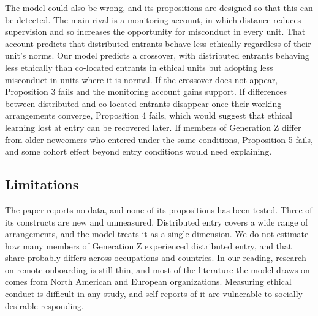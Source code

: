 \documentclass[12pt,a4paper]{article}
\theoremstyle{definition}
\begin{document}
The model could also be wrong, and its propositions are designed so that this can be detected. The main rival is a monitoring account, in which distance reduces supervision and so increases the opportunity for misconduct in every unit. That account predicts that distributed entrants behave less ethically regardless of their unit's norms. Our model predicts a crossover, with distributed entrants behaving less ethically than co-located entrants in ethical units but adopting less misconduct in units where it is normal. If the crossover does not appear, Proposition 3 fails and the monitoring account gains support. If differences between distributed and co-located entrants disappear once their working arrangements converge, Proposition 4 fails, which would suggest that ethical learning lost at entry can be recovered later. If members of Generation Z differ from older newcomers who entered under the same conditions, Proposition 5 fails, and some cohort effect beyond entry conditions would need explaining.

\subsection{Limitations}

The paper reports no data, and none of its propositions has been tested. Three of its constructs are new and unmeasured. Distributed entry covers a wide range of arrangements, and the model treats it as a single dimension. We do not estimate how many members of Generation Z experienced distributed entry, and that share probably differs across occupations and countries. In our reading, research on remote onboarding is still thin, and most of the literature the model draws on comes from North American and European organizations. Measuring ethical conduct is difficult in any study, and self-reports of it are vulnerable to socially desirable responding.
\end{document}
